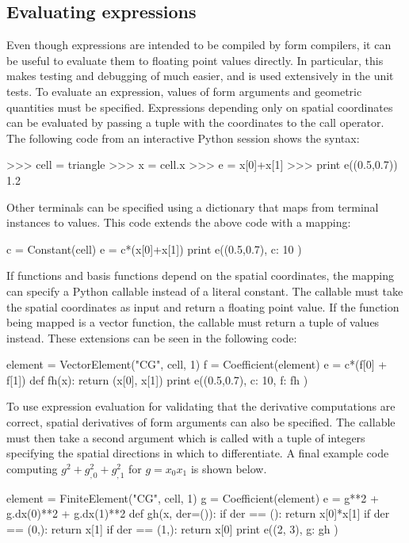 \subsection{Evaluating expressions}
\label{ufl:sec:evaluating}

Even though \ufl{} expressions are intended to be compiled by form
compilers, it can be useful to evaluate them to floating point values
directly. In particular, this makes testing and debugging of \ufl{}
much easier, and is used extensively in the unit tests.  To evaluate
an \ufl{} expression, values of form arguments and geometric
quantities must be specified.  Expressions depending only on spatial
coordinates can be evaluated by passing a tuple with the coordinates
to the call operator. The following code from an interactive Python
session shows the syntax:
\begin{python}
>>> cell = triangle
>>> x = cell.x
>>> e = x[0]+x[1]
>>> print e((0.5,0.7))
1.2
\end{python}
Other terminals can be specified using a dictionary that maps from
terminal instances to values.  This code extends the above code with a
mapping:
\begin{python}
c = Constant(cell)
e = c*(x[0]+x[1])
print e((0.5,0.7), { c: 10 })
\end{python}
If functions and basis functions depend on the spatial coordinates,
the mapping can specify a Python callable instead of a literal
constant.  The callable must take the spatial coordinates as input and
return a floating point value.  If the function being mapped is a
vector function, the callable must return a tuple of values instead.
These extensions can be seen in the following code:
\begin{python}
element = VectorElement("CG", cell, 1)
f = Coefficient(element)
e = c*(f[0] + f[1])
def fh(x):
    return (x[0], x[1])
print e((0.5,0.7), { c: 10, f: fh })
\end{python}
To use expression evaluation for validating that the derivative
computations are correct, spatial derivatives of form arguments can
also be specified.  The callable must then take a second argument
which is called with a tuple of integers specifying the spatial
directions in which to differentiate. A final example code computing
$g^2 + g_{,0}^2 + g_{,1}^2$ for $g=x_0x_1$ is shown below.
\begin{python}
element = FiniteElement("CG", cell, 1)
g = Coefficient(element)
e = g**2 + g.dx(0)**2 + g.dx(1)**2
def gh(x, der=()):
    if der == ():   return x[0]*x[1]
    if der == (0,): return x[1]
    if der == (1,): return x[0]
print e((2, 3), { g: gh })
\end{python}

